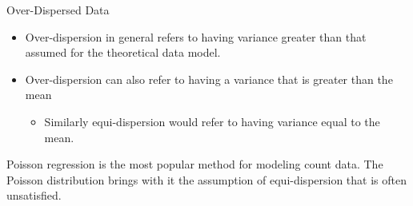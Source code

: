\documentclass[
  ignorenonframetext,
]{beamer}
\providecommand{\tightlist}{%
  \setlength{\itemsep}{0pt}\setlength{\parskip}{0pt}}\usepackage{longtable,booktabs,array}
\begin{document}
\begin{frame}{Over-Dispersed Data}
\protect\hypertarget{over-dispersed-data}{}
\begin{itemize}
\tightlist
\item
  Over-dispersion in general refers to having variance greater than that
  assumed for the theoretical data model.\\
\item
  Over-dispersion can also refer to having a variance that is greater
  than the mean

  \begin{itemize}
  \tightlist
  \item
    Similarly equi-dispersion would refer to having variance equal to
    the mean.
  \end{itemize}
\end{itemize}

\begin{tcolorbox}[enhanced jigsaw, titlerule=0mm, colback=white, coltitle=black, colbacktitle=quarto-callout-note-color!10!white, colframe=quarto-callout-note-color-frame, breakable, rightrule=.15mm, opacityback=0, title={Poisson regression}, bottomtitle=1mm, bottomrule=.15mm, opacitybacktitle=0.6, toptitle=1mm, arc=.35mm, toprule=.15mm, leftrule=.75mm, left=2mm]

Poisson regression is the most popular method for modeling count data.
The Poisson distribution brings with it the assumption of
equi-dispersion that is often unsatisfied.

\end{tcolorbox}
\end{frame}
\end{document}
